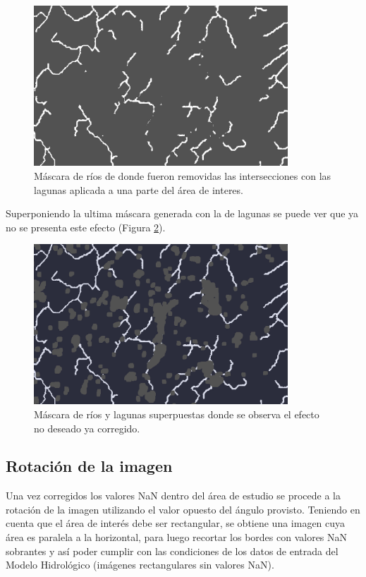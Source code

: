 \documentclass[10pt,a4paper, twoside]{report}
\begin{document}
\begin{figure}[H]
   \centering      
   \includegraphics[width=0.85\textwidth]{imagenes/riversSinLagunas.jpg}
 \caption{Máscara de ríos de donde fueron removidas las intersecciones con las lagunas aplicada a una parte del área de interes.}
 \label{riversSinLagunas}
\end{figure}

Superponiendo la ultima máscara generada con la de lagunas se puede ver que ya no se presenta este efecto (Figura \ref{riversYLagunas}).

\begin{figure}[H]
   \centering      
   \includegraphics[width=0.85\textwidth]{imagenes/riversYLagunas.jpg}
 \caption{Máscara de ríos y lagunas superpuestas donde se observa el efecto no deseado ya corregido.}
 \label{riversYLagunas}
\end{figure}

\subsection{Rotación de la imagen}

Una vez corregidos los valores NaN dentro del área de estudio se procede a la rotación de la imagen utilizando el valor opuesto del ángulo provisto. Teniendo en cuenta que el área de interés debe ser rectangular, se obtiene una imagen cuya área es paralela a la horizontal, para luego recortar los bordes con valores NaN sobrantes y así poder cumplir con las condiciones de los datos de entrada del Modelo Hidrológico (imágenes rectangulares sin valores NaN).
\end{document}
